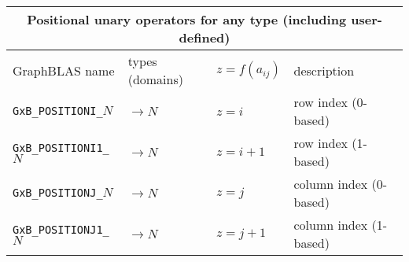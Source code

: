 \documentclass[12pt]{article}
\begin{document}
{\vspace{0.2in}
\begin{tabular}{|llll|}
\hline
\multicolumn{4}{|c|}{Positional unary operators for any type (including user-defined)} \\
\hline
GraphBLAS name            & types (domains)   & $z=f(a_{ij})$      & description \\
\hline
\verb'GxB_POSITIONI_'$N$  & $ \rightarrow N$  & $z = i$       & row index (0-based) \\
\verb'GxB_POSITIONI1_'$N$ & $ \rightarrow N$  & $z = i+1$     & row index (1-based) \\
\verb'GxB_POSITIONJ_'$N$  & $ \rightarrow N$  & $z = j$       & column index (0-based) \\
\verb'GxB_POSITIONJ1_'$N$ & $ \rightarrow N$  & $z = j+1$     & column index (1-based) \\
\hline
\end{tabular}
\vspace{0.2in}

}
\end{document}
